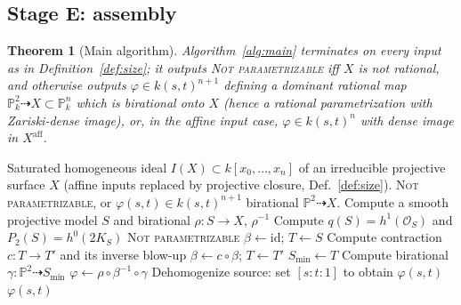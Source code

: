 \documentclass{amsart}
\theoremstyle{plain}
\newtheorem{theorem}{Theorem}
\theoremstyle{definition}
\newcommand{\PP}{\mathbb{P}}
\newcommand{\cO}{\mathcal{O}}
\begin{document}
\subsection{Stage E: assembly}

\begin{theorem}[Main algorithm]\label{thm:main}
Algorithm~\ref{alg:main} terminates on every input as in
Definition~\ref{def:size}; it outputs \textsc{Not parametrizable} iff $X$ is not
rational, and otherwise outputs $\varphi\in k(s,t)^{n+1}$ defining a dominant
rational map $\PP^2_k\dashrightarrow X\subset\PP^n_k$ which is birational onto
$X$ (hence a rational parametrization with Zariski-dense image), or, in the
affine input case, $\varphi\in k(s,t)^{n}$ with dense image in
$X^{\mathrm{aff}}$.
\end{theorem}

\begin{algorithm}
\caption{Rational parametrization of a surface}\label{alg:main}
\begin{algorithmic}[1]
\Require Saturated homogeneous ideal $I(X)\subset k[x_0,\dots,x_n]$ of an
irreducible projective surface $X$ (affine inputs replaced by projective closure,
Def.~\ref{def:size}).
\Ensure \textsc{Not parametrizable}, or $\varphi(s,t)\in k(s,t)^{n+1}$ birational
$\PP^2\dashrightarrow X$.
\State Compute a smooth projective model $S$ and birational $\rho\colon S\to X$,
$\rho^{-1}$ 
\State Compute $q(S)=h^1(\cO_S)$ and $P_2(S)=h^0(2K_S)$ 
  \State \Return \textsc{Not parametrizable} 
\EndIf
\State $\beta\gets\mathrm{id}$; $T\gets S$
 
  \State Compute contraction $c\colon T\to T'$ and its inverse blow-up
  \State $\beta\gets c\circ\beta$; $T\gets T'$
\EndWhile
\State $S_{\min}\gets T$ \Comment{minimal; $\PP^2$ or $\mathbb F_e$}
\State Compute birational $\gamma\colon\PP^2\dashrightarrow S_{\min}$
\State $\varphi\gets\rho\circ\beta^{-1}\circ\gamma$ 
\State Dehomogenize source: set $[s:t:1]$ to obtain $\varphi(s,t)$
\State \Return $\varphi(s,t)$
\end{algorithmic}
\end{algorithm}
\end{document}

